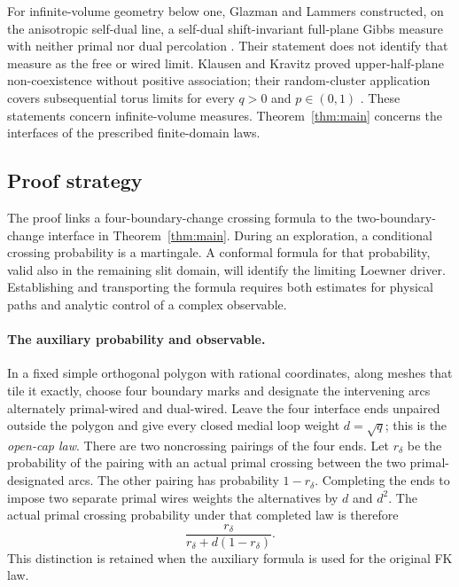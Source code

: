 For infinite-volume geometry below one, Glazman and Lammers constructed,
on the anisotropic self-dual line, a self-dual
shift-invariant full-plane Gibbs measure with neither primal nor dual
percolation \cite[Remark~2.8]{GlazmanLammers2025}.  Their statement
does not identify that measure as the free or wired limit.
Klausen and Kravitz proved upper-half-plane non-coexistence without
positive association; their random-cluster application covers
subsequential torus limits for every $q>0$ and $p\in(0,1)$
\cite[Section~3 and Corollary~3.1]{KlausenKravitz2026}.
These statements concern infinite-volume measures. Theorem~\ref{thm:main}
concerns the interfaces of the prescribed finite-domain laws.

\subsection{Proof strategy}

The proof links a four-boundary-change crossing formula to the
two-boundary-change interface in Theorem~\ref{thm:main}. During an
exploration, a conditional crossing probability is a martingale. A
conformal formula for that probability, valid also in the remaining
slit domain, will identify the limiting Loewner driver. Establishing
and transporting the formula requires both estimates for physical
paths and analytic control of a complex observable.

\paragraph{The auxiliary probability and observable.}
In a fixed simple orthogonal polygon with rational coordinates, along
meshes that tile it exactly, choose four boundary marks and
designate the intervening arcs alternately primal-wired and dual-wired.
Leave the four interface ends unpaired outside the polygon and give
every closed medial loop weight $d=\sqrt q$; this is the
\emph{open-cap law}. There are two noncrossing pairings of the four
ends. Let $r_\delta$ be the probability of the pairing with an actual
primal crossing between the two primal-designated arcs. The other
pairing has probability $1-r_\delta$. Completing the ends to impose
two separate primal wires weights the
alternatives by $d$ and $d^2$. The actual primal crossing probability
under that completed law is therefore
\[
 \frac{r_\delta}{r_\delta+d(1-r_\delta)}.
\]
This distinction is retained when the auxiliary formula is used for
the original FK law.

